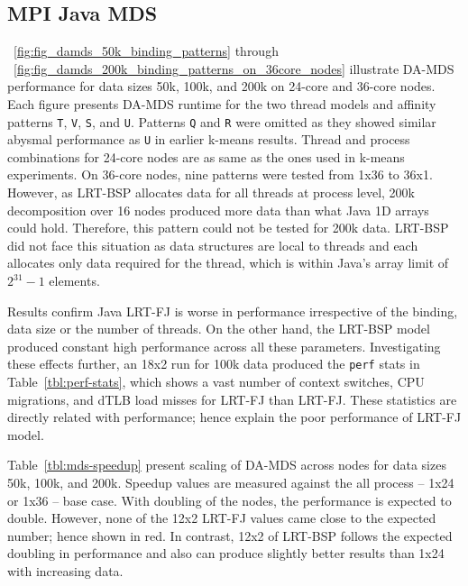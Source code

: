 \documentclass[10pt, conference, compsocconf]{IEEEtran}
\begin{document}
\subsection{MPI Java \ac{MDS}}
\figurename~\ref{fig:fig_damds_50k_binding_patterns} through \figurename~\ref{fig:fig_damds_200k_binding_patterns_on_36core_nodes} illustrate \ac{DA-MDS} performance for data sizes 50k, 100k, and 200k on 24-core and 36-core nodes. Each figure presents \ac{DA-MDS} runtime for the two thread models and affinity patterns \texttt{T}, \texttt{V}, \texttt{S}, and \texttt{U}. Patterns \texttt{Q} and \texttt{R} were omitted as they showed similar abysmal performance as \texttt{U} in earlier k-means results. Thread and process combinations for 24-core nodes are as same as the ones used in k-means experiments. On 36-core nodes, nine patterns were tested from 1x36 to 36x1. However, as \ac{LRT-BSP} allocates data for all threads at process level, 200k decomposition over 16 nodes produced more data than what Java 1D arrays could hold. Therefore, this pattern could not be tested for 200k data. \ac{LRT-BSP} did not face this situation as data structures are local to threads and each allocates only data required for the thread, which is within Java's array limit of $2^31 - 1$ elements.

Results confirm Java \ac{LRT-FJ} is worse in performance irrespective of the binding, data size or the number of threads. On the other hand, the \ac{LRT-BSP} model produced constant high performance across all these parameters. Investigating these effects further, an 18x2 run for 100k data produced the \texttt{perf} stats in Table~\ref{tbl:perf-stats}, which shows a vast number of context switches, \acs{CPU} migrations, and \acl{dTLB} load misses for \ac{LRT-FJ} than \ac{LRT-FJ}. These statistics are directly related with performance; hence explain the poor performance of \ac{LRT-FJ} model.

Table~\ref{tbl:mds-speedup} present scaling of \ac{DA-MDS} across nodes for data sizes 50k, 100k, and 200k. Speedup values are measured against the all process -- 1x24 or 1x36 -- base case. With doubling of the nodes, the performance is expected to double. However, none of the 12x2 \ac{LRT-FJ} values came close to the expected number; hence shown in red.  In contrast, 12x2 of \ac{LRT-BSP} follows the expected doubling in performance and also can produce slightly better results than 1x24 with increasing data.
\end{document}
